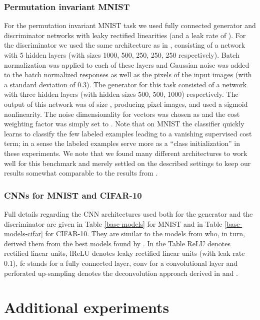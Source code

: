 \documentclass{article} \usepackage{iclr2016_conference,times}
\newcommand{\TODO}[2][JTS]{}
\begin{document}
\begin{appendix}
\subsubsection{Permutation invariant MNIST}
For the permutation invariant MNIST task we used fully connected
generator and discriminator networks with leaky rectified linearities
(and a leak rate of ). For the discriminator we used the same
architecture as in \citet{Rasmus_NIPS2015}, consisting of a network
with 5 hidden layers (with sizes 1000, 500, 250, 250, 250
respectively). Batch normalization was applied to each of these layers
and Gaussian noise was added to the batch normalized responses as well
as the pixels of the input images (with a standard deviation of 0.3).
The generator for this task consisted of a network with three hidden
layers (with hidden sizes 500, 500, 1000) respectively. The output of
this network was of size , producing pixel images,
and used a sigmoid nonlinearity. The noise dimensionality for vectors
 was chosen as  and the cost weighting factor 
was simply set to . Note that on MNIST the classifier
quickly learns to classify the few labeled examples leading to a
vanishing supervised cost term; in a sense the labeled examples serve
more as a ``class initialization'' in these experiments. We note that we
found many different architectures to work well for this benchmark and
merely settled on the described settings to keep our results somewhat
comparable to the results from \citet{Rasmus_NIPS2015}.

\subsubsection{CNNs for MNIST and CIFAR-10}
Full details regarding the CNN architectures used both for the
generator and the discriminator are given in Table \ref{base-models}
for MNIST and in Table \ref{base-models-cifar} for CIFAR-10. They are
similar to the models from \citet{Rasmus_NIPS2015} who, in turn,
derived them from the best models found by \citet{SprDosBroRied15}. In
the Table ReLU denotes rectified linear units, lReLU denotes leaky
rectified linear units (with leak rate 0.1), fc stands for a fully
connected layer, conv for a convolutional layer and perforated
up-sampling denotes the deconvolution approach derived in
\citet{DosSprChair15} and \citet{OseSoySma2014}. 
\TODO{Double check that these network definitions are correct}



\section{Additional experiments}


\end{appendix}
\end{document}
